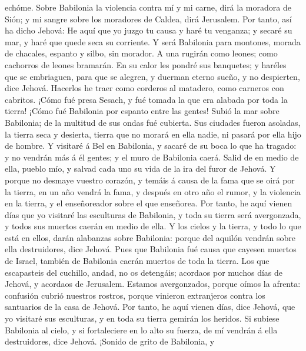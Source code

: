 echóme.  Sobre Babilonia la violencia contra mí y mi carne,
dirá la moradora de Sión; y mi sangre sobre los moradores de Caldea,
dirá Jerusalem.  Por tanto, así ha dicho Jehová: He aquí
que yo juzgo tu causa y haré tu venganza; y secaré su mar, y haré que
quede seca su corriente.  Y será Babilonia para montones,
morada de chacales, espanto y silbo, sin morador.  A una
rugirán como leones; como cachorros de leones bramarán.  En
su calor les pondré sus banquetes; y haréles que se embriaguen, para que
se alegren, y duerman eterno sueño, y no despierten, dice Jehová.
 Hacerlos he traer como corderos al matadero, como carneros
con cabritos.  ¡Cómo fué presa Sesach, y fué tomada la que
era alabada por toda la tierra! ¡Cómo fué Babilonia por espanto entre
las gentes!  Subió la mar sobre Babilonia; de la multitud
de sus ondas fué cubierta.  Sus ciudades fueron asoladas,
la tierra seca y desierta, tierra que no morará en ella nadie, ni pasará
por ella hijo de hombre.  Y visitaré á Bel en Babilonia, y
sacaré de su boca lo que ha tragado: y no vendrán más á él gentes; y el
muro de Babilonia caerá.  Salid de en medio de ella, pueblo
mío, y salvad cada uno su vida de la ira del furor de Jehová.
 Y porque no desmaye vuestro corazón, y temáis á causa de
la fama que se oirá por la tierra, en un año vendrá la fama, y después
en otro año el rumor, y la violencia en la tierra, y el enseñoreador
sobre el que enseñorea.  Por tanto, he aquí vienen días que
yo visitaré las esculturas de Babilonia, y toda su tierra será
avergonzada, y todos sus muertos caerán en medio de ella. 
Y los cielos y la tierra, y todo lo que está en ellos, darán alabanzas
sobre Babilonia: porque del aquilón vendrán sobre ella destruidores,
dice Jehová.  Pues que Babilonia fué causa que cayesen
muertos de Israel, también de Babilonia caerán muertos de toda la
tierra.  Los que escapasteis del cuchillo, andad, no os
detengáis; acordaos por muchos días de Jehová, y acordaos de Jerusalem.
 Estamos avergonzados, porque oímos la afrenta: confusión
cubrió nuestros rostros, porque vinieron extranjeros contra los
santuarios de la casa de Jehová.  Por tanto, he aquí vienen
días, dice Jehová, que yo visitaré sus esculturas, y en toda su tierra
gemirán los heridos.  Si subiese Babilonia al cielo, y si
fortaleciere en lo alto su fuerza, de mí vendrán á ella destruidores,
dice Jehová.  ¡Sonido de grito de Babilonia, y
